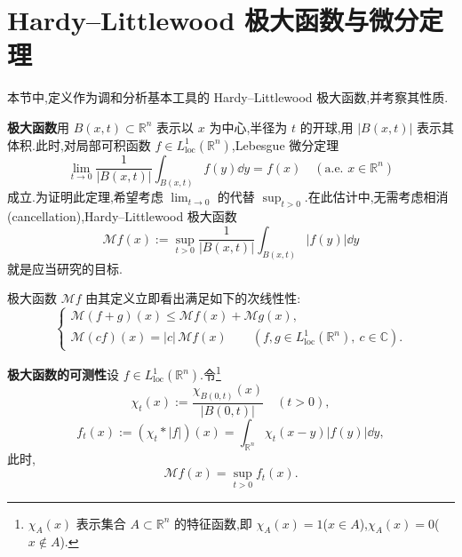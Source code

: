 \section{Hardy--Littlewood 极大函数与微分定理}\label{sec:4.1}


本节中,定义作为调和分析基本工具的 Hardy--Littlewood 极大函数,并考察其性质.

\noindent\textbf{极大函数}\quad 用 $B(x,t)\subset\mathbb{R}^{n}$ 表示以 $x$ 为中心,半径为 $t$ 的开球,用 $|B(x,t)|$ 表示其体积.此时,对局部可积函数 $f \in L_{\mathrm{loc}}^{1}(\mathbb{R}^{n})$,Lebesgue 微分定理
\begin{equation}
\lim_{t \to 0}\frac{1}{|B(x,t)|}\int_{B(x,t)}f(y)\dd y = f(x) \quad (\text{a.e. } x \in \mathbb{R}^{n})\tag{4.1.1}
\label{eq:4.1.1}\end{equation}
成立.为证明此定理,希望考虑 $\lim_{t\to 0}$ 的代替 $\sup_{t>0}$.在此估计中,无需考虑相消(cancellation),Hardy--Littlewood 极大函数
\begin{equation}
\mathcal{M}f(x) := \sup_{t > 0}\frac{1}{|B(x,t)|}\int_{B(x,t)}|f(y)|\dd y\tag{4.1.2}
\label{eq:4.1.2}\end{equation}
就是应当研究的目标.

极大函数 $\mathcal{M}f$ 由其定义立即看出满足如下的次线性性:
\begin{equation}
\begin{cases}
\mathcal{M}(f + g)(x) \leq \mathcal{M}f(x) + \mathcal{M}g(x), \\
\mathcal{M}(cf)(x) = |c|\,\mathcal{M}f(x) \qquad (f, g \in L_{\mathrm{loc}}^{1}(\mathbb{R}^{n}),\ c \in \mathbb{C}).
\end{cases}\tag{4.1.3}
\label{eq:4.1.3}\end{equation}

\noindent\textbf{极大函数的可测性}\quad 设 $f \in L_{\mathrm{loc}}^{1}(\mathbb{R}^{n})$.令\footnote{$\chi_{A}(x)$ 表示集合 $A \subset \mathbb{R}^{n}$ 的特征函数,即 $\chi_{A}(x) = 1$($x \in A$),$\chi_{A}(x) = 0$($x \notin A$).}
\begin{equation*}
\chi_{t}(x) := \frac{\chi_{B(0,t)}(x)}{|B(0,t)|} \quad (t > 0),
\end{equation*}
\begin{equation*}
f_{t}(x) := (\chi_{t} * |f|)(x) = \int_{\mathbb{R}^{n}}\chi_{t}(x - y)|f(y)|\dd y,
\end{equation*}
此时,
\begin{equation*}
\mathcal{M}f(x) = \sup_{t > 0}f_{t}(x).
\end{equation*}

